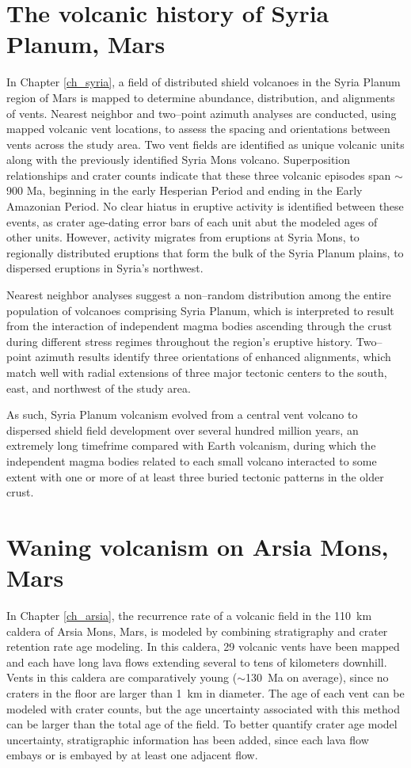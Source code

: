 \section{The volcanic history of Syria Planum, Mars}
In Chapter \ref{ch_syria}, a field of distributed shield volcanoes in the Syria Planum region of Mars is mapped to determine abundance, distribution, and alignments of vents. Nearest neighbor and two--point azimuth analyses are conducted, using mapped volcanic vent locations, to assess the spacing and orientations between vents across the study area. Two vent fields are identified as unique volcanic units along with the previously identified Syria Mons volcano. Superposition relationships and crater counts indicate that these three volcanic episodes span $\sim$900 Ma, beginning in the early Hesperian Period and ending in the Early Amazonian Period. No clear hiatus in eruptive activity is identified between these events, as crater age-dating error bars of each unit abut the modeled ages of other units. However, activity migrates from eruptions at Syria Mons, to regionally distributed eruptions that form the bulk of the Syria Planum plains, to dispersed eruptions in Syria's northwest. 

Nearest neighbor analyses suggest a non--random distribution among the entire population of volcanoes comprising Syria Planum, which is interpreted to result from the interaction of independent magma bodies ascending through the crust during different stress regimes throughout the region's eruptive history. Two--point azimuth results identify three orientations of enhanced alignments, which match well with radial extensions of three major tectonic centers to the south, east, and northwest of the study area. 

As such, Syria Planum volcanism evolved from a central vent volcano to dispersed shield field development over several hundred million years, an extremely long timefrime compared with Earth volcanism, during which the independent magma bodies related to each small volcano interacted to some extent with one or more of at least three buried tectonic patterns in the older crust.


\section{Waning volcanism on Arsia Mons, Mars}
In Chapter \ref{ch_arsia}, the recurrence rate of a volcanic field in the 110~km caldera of Arsia Mons, Mars, is modeled by combining stratigraphy and crater retention rate age modeling. In this caldera, 29 volcanic vents have been mapped and each have long lava flows extending several to tens of kilometers downhill. Vents in this caldera are comparatively young ($\sim$130~Ma on average), since no craters in the floor are larger than 1~km in diameter. The age of each vent can be modeled with crater counts, but the age uncertainty associated with this method can be larger than the total age of the field. To better quantify crater age model uncertainty, stratigraphic information has been added, since each lava flow embays or is embayed by at least one adjacent flow.

